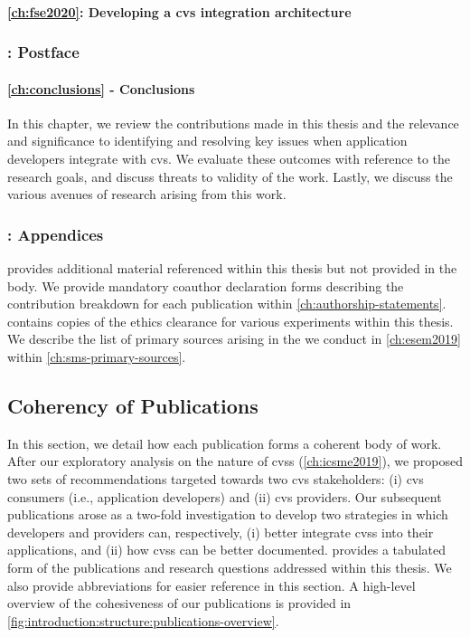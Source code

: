 \paragraph{\cref{ch:fse2020}: Developing a \gls{cvs} integration architecture} 

\subsubsection{: Postface}

\paragraph{\cref{ch:conclusions} - Conclusions} In this chapter, we review the contributions made in this thesis and the relevance and significance to identifying and resolving key issues when application developers integrate with \gls{cvs}. We evaluate these outcomes with reference to the research goals, and discuss threats to validity of the work. Lastly, we discuss the various avenues of research arising from this work.

\subsubsection{: Appendices}

 provides additional material referenced within this thesis but not provided in the body. We provide mandatory coauthor declaration forms describing the contribution breakdown for each publication within \cref{ch:authorship-statements}.  contains copies of the ethics clearance for various experiments within this thesis. We describe the list of primary sources arising in the  we conduct in \cref{ch:esem2019} within \cref{ch:sms-primary-sources}.


\subsection{Coherency of Publications}

In this section, we detail how each publication forms a coherent body of work. After our exploratory analysis on the nature of \glspl{cvs} (\cref{ch:icsme2019}), we proposed two sets of recommendations targeted towards two \gls{cvs} stakeholders: (i) \gls{cvs} consumers (i.e., application developers) and (ii) \gls{cvs} providers. Our subsequent publications arose as a two-fold investigation to develop two strategies in which developers and providers can, respectively, (i) better integrate \glspl{cvs} into their applications, and (ii) how \glspl{cvs} can be better documented.  provides a tabulated form of the publications and research questions addressed within this thesis. We also provide abbreviations for easier reference in this section. A high-level overview of the cohesiveness of our publications is provided in \cref{fig:introduction:structure:publications-overview}.

